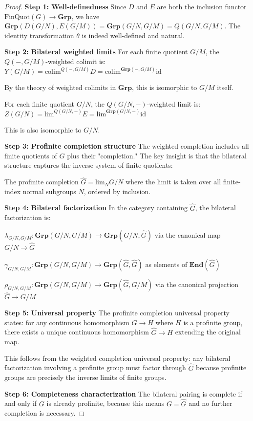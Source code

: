 \documentclass[11pt]{article}
\theoremstyle{plain}
\theoremstyle{definition}
\theoremstyle{remark}
\newcommand{\colim}{\mathrm{colim}}
\renewcommand{\lim}{\mathrm{lim}}
\begin{document}
\begin{proof}
\textbf{Step 1: Well-definedness}
Since $D$ and $E$ are both the inclusion functor $\mathrm{FinQuot}(G) \to \mathbf{Grp}$, we have $\mathbf{Grp}(D(G/N), E(G/M)) = \mathbf{Grp}(G/N, G/M) = Q(G/N, G/M)$. The identity transformation $\theta$ is indeed well-defined and natural.

\textbf{Step 2: Bilateral weighted limits}
For each finite quotient $G/M$, the $Q(-, G/M)$-weighted colimit is:
$Y(G/M) = \colim^{Q(-, G/M)} D = \colim^{\mathbf{Grp}(-, G/M)} \text{id}$

By the theory of weighted colimits in $\mathbf{Grp}$, this is isomorphic to $G/M$ itself.

For each finite quotient $G/N$, the $Q(G/N, -)$-weighted limit is:
$Z(G/N) = \lim^{Q(G/N, -)} E = \lim^{\mathbf{Grp}(G/N, -)} \text{id}$

This is also isomorphic to $G/N$.

\textbf{Step 3: Profinite completion structure}
The weighted completion includes all finite quotients of $G$ plus their "completion." The key insight is that the bilateral structure captures the inverse system of finite quotients:

The profinite completion $\widehat{G} = \lim_{N} G/N$ where the limit is taken over all finite-index normal subgroups $N$, ordered by inclusion.

\textbf{Step 4: Bilateral factorization}
In the category containing $\widehat{G}$, the bilateral factorization is:

$\lambda_{G/N, G/M} : \mathbf{Grp}(G/N, G/M) \to \mathbf{Grp}(G/N, \widehat{G})$ via the canonical map $G/N \to \widehat{G}$

$\gamma_{G/N, G/M} : \mathbf{Grp}(G/N, G/M) \to \mathbf{Grp}(\widehat{G}, \widehat{G})$ as elements of $\mathbf{End}(\widehat{G})$

$\rho_{G/N, G/M} : \mathbf{Grp}(G/N, G/M) \to \mathbf{Grp}(\widehat{G}, G/M)$ via the canonical projection $\widehat{G} \to G/M$

\textbf{Step 5: Universal property}
The profinite completion universal property states: for any continuous homomorphism $G \to H$ where $H$ is a profinite group, there exists a unique continuous homomorphism $\widehat{G} \to H$ extending the original map.

This follows from the weighted completion universal property: any bilateral factorization involving a profinite group must factor through $\widehat{G}$ because profinite groups are precisely the inverse limits of finite groups.

\textbf{Step 6: Completeness characterization}
The bilateral pairing is complete if and only if $G$ is already profinite, because this means $G = \widehat{G}$ and no further completion is necessary.
\end{proof}
\end{document}

